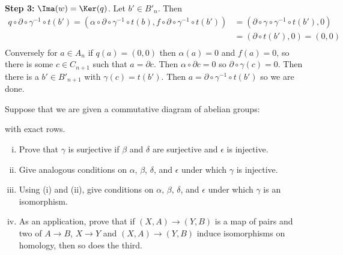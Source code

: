 \documentclass[11pt,letterpaper]{article}
\begin{document}
\begin{solution}
    \textbf{Step 3:} $\Ima(w) = \Ker(q)$. Let $b'\in B'_n$. Then
    \[
        \begin{aligned}
            q\circ \partial\circ \gamma^{-1}\circ t(b') = (\alpha\circ \partial\circ \gamma^{-1}\circ t(b), f\circ \partial \circ \gamma^{-1}\circ t(b')) &= (\partial\circ\gamma\circ \gamma^{-1}\circ t(b'), 0)\\
            &= (\partial \circ t(b'), 0) = (0,0)\\
        \end{aligned}
    \]  
    Conversely for $a\in A_n$ if $q(a)=(0,0)$ then $\alpha(a)=0$ and $f(a)=0$, so there is some $c\in C_{n+1}$ such that $a=\partial c$. Then $\alpha\circ\partial c = 0$ so $\partial\circ\gamma(c)=0$. Then there is a $b'\in B'_{n+1}$ with $\gamma(c)=t(b')$. Then $a=\partial\circ\gamma^{-1}\circ t(b')$ so we are done.   
\end{solution}

\begin{problem}
    Suppose that we are given a commutative diagram of abelian groups:
    \medskip
    \begin{center}
    \end{center}
    \medskip
    with exact rows.
    \begin{enumerate}[(i)]
        \item Prove that $\gamma$ is surjective if $\beta$ and $\delta$ are surjective and $\epsilon$ is injective.
        \item Give analogous conditions on $\alpha$, $\beta$, $\delta$, and $\epsilon$ under which $\gamma$ is injective. 
        \item Using (i) and (ii), give conditions on $\alpha$, $\beta$, $\delta$, and $\epsilon$ under which $\gamma$ is an isomorphism.
        \item As an application, prove that if $(X,A) \to (Y,B)$ is a map of pairs and two of $A \to B$,
        $X \to Y$ and $(X,A) \to (Y,B)$ induce isomorphisms on homology, then so does the third.
    \end{enumerate}
\end{problem}
\end{document}
